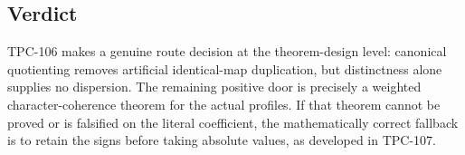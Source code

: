 \documentclass[11pt]{article}
\theoremstyle{remark}
\begin{document}
\subsection*{Verdict}

TPC-106 makes a genuine route decision at the theorem-design level:
canonical quotienting removes artificial identical-map duplication,
but distinctness alone supplies no dispersion.  The remaining
positive door is precisely a weighted character-coherence theorem
for the actual profiles.  If that theorem cannot be proved or is
falsified on the literal coefficient, the mathematically correct
fallback is to retain the signs before taking absolute values, as
developed in TPC-107.

\begingroup
\footnotesize
\raggedright


\endgroup
\end{document}
